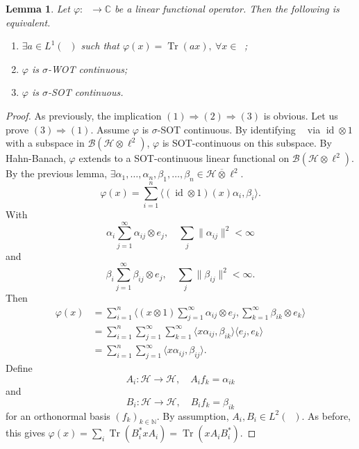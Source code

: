 \documentclass[10pt, a4paper]{article}
\newtheorem{lemma}[thm]{Lemma}
\newenvironment{noticeC}{%
  \tcolorbox[%
  notitle,
  empty,
  enhanced,  %
  breakable,
  coltext=black, 
  fontupper=\rmfamily,
  noparskip,
  sharp corners,
  boxrule=-1pt,  %
  frame hidden,
  left=7pt,  %
  right=7pt,
  top=5pt,
  bottom=5pt,
  before skip=2.5ex plus 2pt,
  after skip=2.5ex plus 2pt,
  overlay unbroken and last={%
  },
  ]}
{\endtcolorbox}
\newenvironment{myproof}%
  {\begin{noticeC}\begin{proof}}%
  {\end{proof}\end{noticeC}}
\newcommand{\N}{\mathbb {N}}
\newcommand{\C}{\mathbb {C}}
\DeclareMathOperator{\trace}{Tr}
\DeclareMathOperator{\id}{id}
\DeclareMathOperator{\bh}{\mathcal{B} (\mathcal{H})}
\begin{document}
\begin{lemma}
  Let $\varphi: \bh \to \C$ be a linear functional operator. Then the following is equivalent.
  \begin{enumerate}
    \item $\exists a \in L^1 (\bh)$ such that $\varphi(x) = \trace (a x),\ \forall x \in \bh$;
    \item $\varphi$ is $\sigma$-WOT continuous;
    \item $\varphi$ is $\sigma$-SOT continuous.
  \end{enumerate}
\end{lemma}

\begin{myproof}
  As previously, the implication $(1) \Rightarrow (2) \Rightarrow (3)$ is obvious.
  Let us prove $(3) \Rightarrow (1)$. Assume $\varphi$ is $\sigma$-SOT continuous.
  By identifying $\bh$ via $\id \otimes 1$ with a subspace in $\mathcal{B} (\mathcal{H} \otimes \ell^2)$,
  $\varphi$ is SOT-continuous on this subspace. By Hahn-Banach, $\varphi$ extends to a SOT-continuous 
  linear functional on $\mathcal{B} (\mathcal{H} \otimes \ell^2)$.
  By the previous lemma, $\exists \alpha_1, \dots, \alpha_n, \beta_1, \dots, \beta_n \in \mathcal{H} \overline{\otimes} \ell^2$.
  $$\varphi(x) = \sum_{i = 1} ^n \langle (\id \otimes 1) (x) \alpha_i, \beta_i \rangle.$$
  With 
  $$\alpha_i \sum_{j = 1} ^\infty \alpha_{ij} \otimes e_j, \quad \sum_j \| \alpha_{ij} \|^2 < \infty$$
  and 
  $$\beta_i \sum_{j = 1} ^\infty \beta_{ij} \otimes e_j, \quad \sum_j \| \beta_{ij} \|^2 < \infty.$$
  Then 
  \begin{align*}
    \varphi(x) &= \sum_{i = 1} ^n \langle (x \otimes 1) \sum_{j = 1} ^\infty \alpha_{ij} \otimes e_j, \sum_{k = 1} ^\infty \beta_{ik} \otimes e_k\rangle\\
    &= \sum_{i = 1} ^n \sum_{j = 1} ^\infty \sum_{k = 1} ^\infty \langle x \alpha_{ij}, \beta_{ik}\rangle \langle e_j, e_k\rangle\\
    &= \sum_{i = 1} ^n \sum_{j = 1} ^\infty \langle x \alpha_{ij}, \beta_{ij}\rangle.
  \end{align*}
  Define $$A_i : \mathcal{H} \to \mathcal{H},\quad A_i f_k = \alpha_{ik}$$
  and $$B_i : \mathcal{H} \to \mathcal{H},\quad B_i f_k = \beta_{ik}$$
  for an orthonormal basis $(f_k)_{k \in \N}$. By assumption, $A_i, B_i \in L^2 (\bh)$.
  As before, this gives $\varphi (x) = \sum_i \trace (B_i ^* x A_i) = \trace (x A_i B_i^*)$.
\end{myproof}
\end{document}
